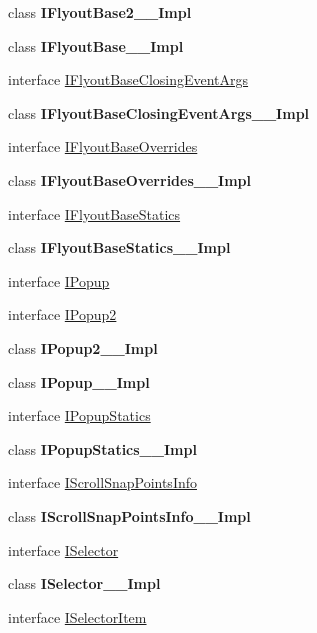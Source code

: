 \begin{DoxyCompactItemize}
\item 
class {\bfseries I\+Flyout\+Base2\+\_\+\+\_\+\+Impl}
\item 
class {\bfseries I\+Flyout\+Base\+\_\+\+\_\+\+Impl}
\item 
interface \hyperlink{interface_windows_1_1_u_i_1_1_xaml_1_1_controls_1_1_primitives_1_1_i_flyout_base_closing_event_args}{I\+Flyout\+Base\+Closing\+Event\+Args}
\item 
class {\bfseries I\+Flyout\+Base\+Closing\+Event\+Args\+\_\+\+\_\+\+Impl}
\item 
interface \hyperlink{interface_windows_1_1_u_i_1_1_xaml_1_1_controls_1_1_primitives_1_1_i_flyout_base_overrides}{I\+Flyout\+Base\+Overrides}
\item 
class {\bfseries I\+Flyout\+Base\+Overrides\+\_\+\+\_\+\+Impl}
\item 
interface \hyperlink{interface_windows_1_1_u_i_1_1_xaml_1_1_controls_1_1_primitives_1_1_i_flyout_base_statics}{I\+Flyout\+Base\+Statics}
\item 
class {\bfseries I\+Flyout\+Base\+Statics\+\_\+\+\_\+\+Impl}
\item 
interface \hyperlink{interface_windows_1_1_u_i_1_1_xaml_1_1_controls_1_1_primitives_1_1_i_popup}{I\+Popup}
\item 
interface \hyperlink{interface_windows_1_1_u_i_1_1_xaml_1_1_controls_1_1_primitives_1_1_i_popup2}{I\+Popup2}
\item 
class {\bfseries I\+Popup2\+\_\+\+\_\+\+Impl}
\item 
class {\bfseries I\+Popup\+\_\+\+\_\+\+Impl}
\item 
interface \hyperlink{interface_windows_1_1_u_i_1_1_xaml_1_1_controls_1_1_primitives_1_1_i_popup_statics}{I\+Popup\+Statics}
\item 
class {\bfseries I\+Popup\+Statics\+\_\+\+\_\+\+Impl}
\item 
interface \hyperlink{interface_windows_1_1_u_i_1_1_xaml_1_1_controls_1_1_primitives_1_1_i_scroll_snap_points_info}{I\+Scroll\+Snap\+Points\+Info}
\item 
class {\bfseries I\+Scroll\+Snap\+Points\+Info\+\_\+\+\_\+\+Impl}
\item 
interface \hyperlink{interface_windows_1_1_u_i_1_1_xaml_1_1_controls_1_1_primitives_1_1_i_selector}{I\+Selector}
\item 
class {\bfseries I\+Selector\+\_\+\+\_\+\+Impl}
\item 
interface \hyperlink{interface_windows_1_1_u_i_1_1_xaml_1_1_controls_1_1_primitives_1_1_i_selector_item}{I\+Selector\+Item}

\end{DoxyCompactItemize}
